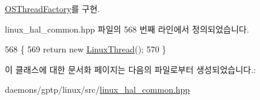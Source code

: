 \hyperlink{class_o_s_thread_factory_a1ba27e729a53bb92e06ac43b87b755fd}{O\+S\+Thread\+Factory}를 구현.



linux\+\_\+hal\+\_\+common.\+hpp 파일의 568 번째 라인에서 정의되었습니다.


\begin{DoxyCode}
568                                     \{
569          \textcolor{keywordflow}{return} \textcolor{keyword}{new} \hyperlink{class_linux_thread}{LinuxThread}();
570      \}
\end{DoxyCode}


이 클래스에 대한 문서화 페이지는 다음의 파일로부터 생성되었습니다.\+:\begin{DoxyCompactItemize}
\item 
daemons/gptp/linux/src/\hyperlink{linux__hal__common_8hpp}{linux\+\_\+hal\+\_\+common.\+hpp}\end{DoxyCompactItemize}

